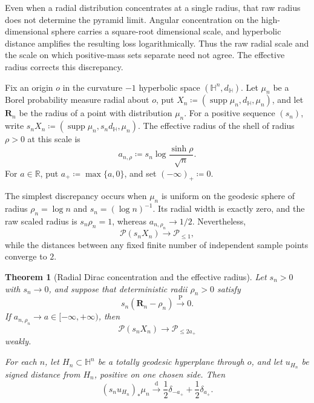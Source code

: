 \documentclass{amsart}
\numberwithin{equation}{section}
\theoremstyle{plain}
\newtheorem{thm}{Theorem}[section]
\theoremstyle{definition}
\theoremstyle{remark}
\newcommand{\R}{\mathbb{R}}
\newcommand{\Hyp}{\mathbb{H}}
\newcommand{\Pyr}{\mathcal{P}}
\DeclareMathOperator{\supp}{supp}
\begin{document}
Even when a radial distribution concentrates at a single radius, that raw radius does not determine the pyramid limit.  Angular concentration on the high-dimensional sphere carries a square-root dimensional scale, and hyperbolic distance amplifies the resulting loss logarithmically.  Thus the raw radial scale and the scale on which positive-mass sets separate need not agree.  The effective radius corrects this discrepancy.

Fix an origin $o$ in the curvature $-1$ hyperbolic space $(\Hyp^n,d_{\Hyp})$.  Let $\mu_n$ be a Borel probability measure radial about $o$, put $X_n\coloneqq(\supp\mu_n,d_{\Hyp},\mu_n)$, and let $\mathbf R_n$ be the radius of a point with distribution $\mu_n$.  For a positive sequence $(s_n)$, write $s_nX_n\coloneqq(\supp\mu_n,s_nd_{\Hyp},\mu_n)$.  The effective radius of the shell of radius $\rho>0$ at this scale is
\begin{equation}\label{eq:discrete-radius}
	a_{n,\rho}\coloneqq s_n\log\frac{\sinh\rho}{\sqrt n}.
\end{equation}
For $a\in\R$, put $a_+\coloneqq\max\{a,0\}$, and set $(-\infty)_+\coloneqq0$.

The simplest discrepancy occurs when $\mu_n$ is uniform on the geodesic sphere of radius $\rho_n=\log n$ and $s_n=(\log n)^{-1}$.  Its radial width is exactly zero, and the raw scaled radius is $s_n\rho_n=1$, whereas $a_{n,\rho_n}\to1/2$.  Nevertheless,
\[ \Pyr(s_nX_n)\longrightarrow\mathcal P_{\le1}, \]
while the distances between any fixed finite number of independent sample points converge to $2$.

\begin{thm}[Radial Dirac concentration and the effective radius]
\label{thm:main}
	Let $s_n>0$ with $s_n\to0$, and suppose that deterministic radii
	$\rho_n>0$ satisfy
	\begin{equation}\label{eq:general-dirac-assumption}
		s_n(\mathbf R_n-\rho_n)\overset{\mathrm P}{\longrightarrow}0.
	\end{equation}
	If $a_{n,\rho_n}\to a\in[-\infty,+\infty)$, then
	\begin{equation}\label{eq:general-pyramid-limit}
		\Pyr(s_nX_n)\longrightarrow\mathcal P_{\le2a_+}
	\end{equation}
	weakly.

	For each $n$, let $H_n\subset\Hyp^n$ be a totally geodesic hyperplane
	through $o$, and let $u_{H_n}$ be signed distance from $H_n$, positive
	on one chosen side.  Then
	\begin{equation}\label{eq:general-signed-witness}
		(s_nu_{H_n})_*\mu_n
		\overset{\mathrm d}{\longrightarrow}
		\frac12\delta_{-a_+}+\frac12\delta_{a_+}.
	\end{equation}
\end{thm}
\end{document}
